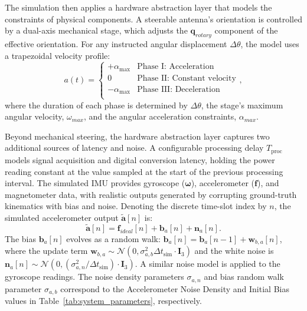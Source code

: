 \documentclass[fleqn,10pt]{wlscirep}
\begin{document}
The simulation then applies a hardware abstraction layer that models the constraints of physical components. A steerable antenna's orientation is controlled by a dual-axis mechanical stage, which adjusts the $\mathbf{q}_{rotary}$ component of the effective orientation. For any instructed angular displacement $\Delta\theta$, the model uses a trapezoidal velocity profile:
\begin{equation}
	a(t) =
	\begin{cases}
		+\alpha_{\text{max}} & \text{Phase I: Acceleration}       \\
		0               & \text{Phase II: Constant velocity} \\
		-\alpha_{\text{max}} & \text{Phase III: Deceleration}     \\
	\end{cases},
\end{equation}
where the duration of each phase is determined by $\Delta\theta$, the stage's maximum angular velocity, $\omega_{max}$, and the angular acceleration constraints, $\alpha_{max}$.

Beyond mechanical steering, the hardware abstraction layer captures two additional sources of latency and noise. A configurable processing delay $T_{\text{proc}}$ models signal acquisition and digital conversion latency, holding the power reading constant at the value sampled at the start of the previous processing interval. The simulated IMU provides gyroscope ($\boldsymbol{\omega}$), accelerometer ($\mathbf{f}$), and magnetometer data, with realistic outputs generated by corrupting ground-truth kinematics with bias and noise. Denoting the discrete time-slot index by $n$, the simulated accelerometer output $\tilde{\mathbf{a}}[n]$ is:
\begin{equation}
    \tilde{\mathbf{a}}[n] = \mathbf{f}_{ideal}[n] + \mathbf{b}_{a}[n] + \mathbf{n}_{a}[n].
\end{equation}
The bias $\mathbf{b}_{a}[n]$ evolves as a random walk: $\mathbf{b}_{a}[n] = \mathbf{b}_{a}[n-1] + \mathbf{w}_{b,a}[n]$, where the update term $\mathbf{w}_{b,a} \sim \mathcal{N}(0, \sigma_{a,b}^2 \Delta t_{\text{sim}} \cdot \mathbf{I}_3)$ and the white noise is $\mathbf{n}_{a}[n] \sim \mathcal{N}(0, (\sigma_{a,n}^2 / \Delta t_{\text{sim}}) \cdot \mathbf{I}_3)$. A similar noise model is applied to the gyroscope readings. The noise density parameters $\sigma_{a,n}$ and bias random walk parameter $\sigma_{a,b}$ correspond to the Accelerometer Noise Density and Initial Bias values in Table~\ref{tab:system_parameters}, respectively.
\end{document}
